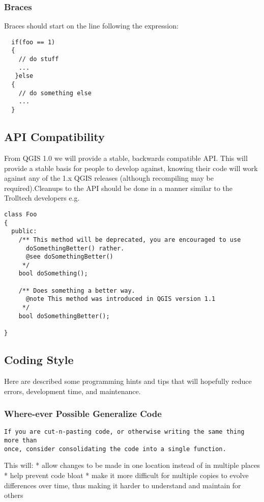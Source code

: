 \subsubsection{Braces}
Braces should start on the line following the expression:

\begin{verbatim}
  if(foo == 1)
  {
    // do stuff
    ...
   }else
  {
    // do something else
    ...
  }
\end{verbatim}

\subsection{API Compatibility}
From QGIS 1.0 we will provide a stable, backwards compatible API. This will
provide a stable basis for people to develop against, knowing their code will
work against any of the 1.x QGIS releases (although recompiling may be
required).Cleanups to the API should be done in a manner similar to the
Trolltech developers e.g.

\begin{verbatim}
class Foo 
{
  public:
    /** This method will be deprecated, you are encouraged to use 
      doSomethingBetter() rather.
      @see doSomethingBetter()
     */
    bool doSomething();

    /** Does something a better way.
      @note This method was introduced in QGIS version 1.1
     */
    bool doSomethingBetter();

}
\end{verbatim}

\subsection{Coding Style}
Here are described some programming hints and tips that will hopefully reduce
errors, development time, and maintenance.

\subsubsection{Where-ever Possible Generalize Code}
\begin{verbatim}
If you are cut-n-pasting code, or otherwise writing the same thing more than
once, consider consolidating the code into a single function.
\end{verbatim}

This will:
  * allow changes to be made in one location instead of in multiple places
  * help prevent code bloat
  * make it more difficult for multiple copies to evolve differences over time,
    thus making it harder to understand and maintain for others

